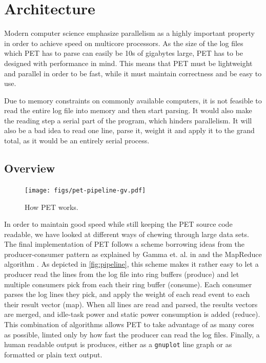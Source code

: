 \section{Architecture}

Modern computer science emphasize parallelism as a highly important property in
order to achieve speed on multicore processors. As the size of the log files
which PET has to parse can easily be 10s of gigabytes large, PET has to be
designed with performance in mind. This means that PET must be lightweight and
parallel in order to be fast, while it must maintain correctness and be easy to
use.

Due to memory constraints on commonly available computers, it is not feasible to
read the entire log file into memory and then start parsing. It would also make
the reading step a serial part of the program, which hinders parallelism. It
will also be a bad idea to read one line, parse it, weight it and apply it to
the grand total, as it would be an entirely serial process.

\subsection{Overview}

\begin{figure}[ht]
    \texttt{[image: figs/pet-pipeline-gv.pdf]}
    \caption{How PET works.}
    \label{fig:pipeline}
\end{figure}

In order to maintain good speed while still keeping the PET source code
readable, we have looked at different ways of chewing through large data sets.
The final implementation of PET follows a scheme borrowing ideas from the
producer-consumer pattern as explained by Gamma et. al. in \cite{designpatterns}
and the MapReduce algorithm \cite{dean2008mapreduce}. As depicted in
\autoref{fig:pipeline}, this scheme makes it rather easy to let a producer read
the lines from the log file into ring buffers (produce) and let multiple
consumers pick from each their ring buffer (consume). Each consumer parses the log
lines they pick, and apply the weight of each read event to each their result
vector (map). When all lines are read and parsed, the results vectors are
merged, and idle-task power and static power consumption is added (reduce). This
combination of algorithms allows PET to take advantage of as many cores as
possible, limted only by how fast the producer can read the log files. Finally,
a human readable output is produces, either as a \texttt{gnuplot} line graph or
as formatted or plain text output.

